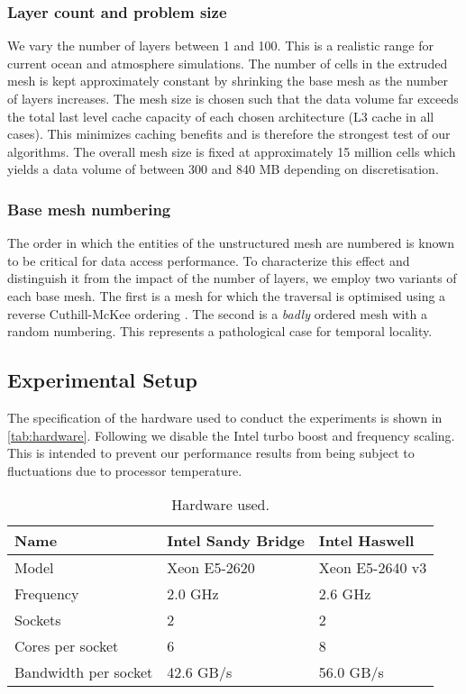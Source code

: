 \documentclass[11pt, a4paper]{scrartcl}
\begin{document}
\subsubsection{Layer count and problem size}
\label{sssec:layer-count}
We vary the number of layers between 1 and 100. This is a realistic
range for current ocean and atmosphere simulations. The number of
cells in the extruded mesh is kept approximately constant by shrinking
the base mesh as the number of layers increases. The mesh size is
chosen such that the data volume far exceeds the total last level
cache capacity of each chosen architecture (L3 cache in all
cases). This minimizes caching benefits and is therefore the strongest
test of our algorithms. The overall mesh size is fixed at
approximately 15 million cells which yields a data volume of between
300 and 840 MB depending on discretisation.

\subsubsection{Base mesh numbering}
\label{sssec:base-numbering}
The order in which the entities of the unstructured mesh are numbered
is known to be critical for data access performance. To characterize
this effect and distinguish it from the impact of the number of
layers, we employ two variants of each base mesh. The first is a mesh
for which the traversal is optimised using a reverse Cuthill-McKee
ordering \citep{Cuthill:1969}. The second is a \emph{badly} ordered
mesh with a random numbering. This represents a pathological case for
temporal locality.

\subsection{Experimental Setup}
\label{ssec:experimental-setup}

The specification of the hardware used to conduct the experiments is
shown in \autoref{tab:hardware}. Following \citet{Ofenbeck:2014} we
disable the Intel turbo boost and frequency scaling. This is intended
to prevent our performance results from being subject to fluctuations
due to processor temperature.
\begin{table}[htbp]
  \centering
  \begin{tabular}{l|l|l}
    Name                 & Intel Sandy Bridge & Intel Haswell   \\
    \hline
    Model                & Xeon E5-2620       & Xeon E5-2640 v3 \\
    Frequency            & 2.0 GHz            & 2.6 GHz         \\
    Sockets              & 2                  & 2               \\
    Cores per socket     & 6                  & 8               \\
    Bandwidth per socket & 42.6 GB/s          & 56.0 GB/s       \\
  \end{tabular}
  \caption{Hardware used.\label{tab:hardware}}
\end{table}
\end{document}
